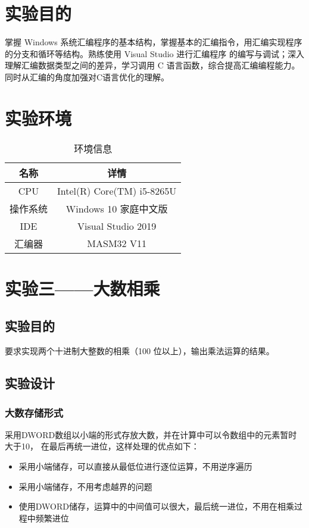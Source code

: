 
\chapter{实验目的}
掌握 Windows 系统汇编程序的基本结构，掌握基本的汇编指令，用汇编实现程序的分支和循环等结构。熟练使用 Visual Studio 进行汇编程序
的编写与调试；深入理解汇编数据类型之间的差异，学习调用 C 语言函数，综合提高汇编编程能力。
同时从汇编的角度加强对C语言优化的理解。

\chapter{实验环境}

\begin{table}[htbp]
    \linespread{2}
    \centering
    \setlength{\tabcolsep}{10mm}%
    \caption{环境信息}\label{环境信息}
    \begin{tabular}{cc}
        \hline
        名称     & 详情                       \\ \hline
        CPU      & Intel(R) Core(TM) i5-8265U \\
        操作系统 & Windows 10 家庭中文版      \\
        IDE      & Visual Studio 2019         \\
        汇编器   & MASM32 V11                 \\ \hline
    \end{tabular}
\end{table}

\chapter{实验三——大数相乘}

\section{实验目的}
要求实现两个十进制大整数的相乘（100 位以上），输出乘法运算的结果。

\section{实验设计}

\subsection{大数存储形式}
采用DWORD数组以小端的形式存放大数，并在计算中可以令数组中的元素暂时大于10，
在最后再统一进位，这样处理的优点如下：
\begin{itemize}
    \item 采用小端储存，可以直接从最低位进行逐位运算，不用逆序遍历
    \item 采用小端储存，不用考虑越界的问题
    \item 使用DWORD储存，运算中的中间值可以很大，最后统一进位，不用在相乘过程中频繁进位
\end{itemize}

